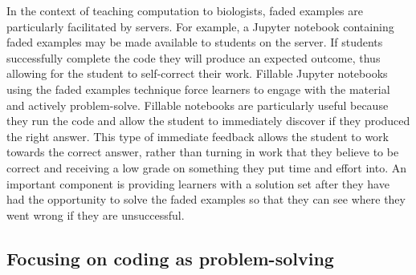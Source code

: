 In the context of teaching computation to biologists, faded examples are particularly facilitated by servers.
For example, a Jupyter notebook containing faded examples may be made available to students on the server.
If students successfully complete the code they will produce an expected outcome, thus allowing for the student to self-correct their work.
Fillable Jupyter notebooks using the faded examples technique force learners to engage with the material and actively problem-solve. 
Fillable notebooks are particularly useful because they run the code and allow the student to immediately discover if they produced the right answer. 
This type of immediate feedback allows the student to work towards the correct answer, rather than turning in work that they believe to be correct and receiving a low grade on something they put time and effort into.
An important component is providing learners with a solution set after they have had the opportunity to solve the faded examples so that they can see where they went wrong if they are unsuccessful.

\subsection{Focusing on coding as problem-solving}

